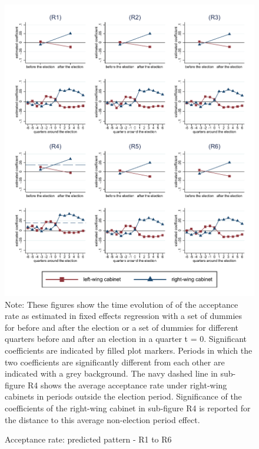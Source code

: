 \documentclass[11pt,a4paper]{scrartcl}
\begin{document}
\clearpage
\FloatBarrier
\begin{figure}[!ht]
	\caption{Acceptance rate: predicted pattern - R1 to R6}
	\includegraphics[width=1\textwidth]{../results/decisions/acceptance_rate_graphs_R1-R6.pdf}
	\scriptsize{Note: These figures show the time evolution of of the acceptance rate as estimated in fixed effects regression with a set of dummies for before and after the election or a set of dummies for different quarters before and after an election in a quarter t = 0. Significant coefficients are indicated by filled plot markers. Periods in which the two coefficients are significantly different from each other are indicated with a grey background. The navy dashed line in sub-figure R4 shows the average acceptance rate under right-wing cabinets in periods outside the election period. Significance of the coefficients of the right-wing cabinet in sub-figure R4 is reported for the distance to this average non-election period effect.}
\end{figure}

\clearpage
\FloatBarrier


\end{document}
